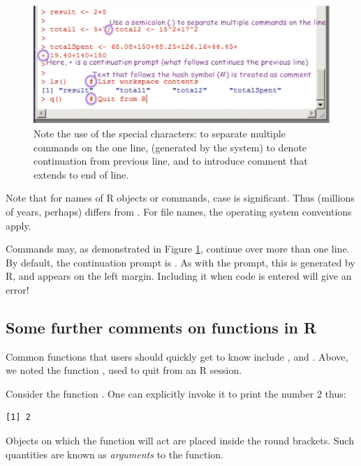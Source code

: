\begin{figure}
\includegraphics{figs-inc/01i-cmds1.jpg}
\caption{Note the use of the special characters: \code{;} to separate
  multiple commands on the one line, \code{+} (generated by the
  system) to denote continuation from previous line, and \code{\#} to
  introduce comment that extends to end of line.\label{fig:cmds1}}
\end{figure}

Note that for names of R objects or commands, case is significant.
Thus  (millions of years, perhaps) differs from .
For file names, the operating system
conventions apply.

Commands may, as demonstrated in Figure \ref{fig:cmds1}, continue over
more than one line. By default, the continuation prompt is \code{+}.
As with the \code{>} prompt, this is generated by R, and appears on
the left margin.  Including it when code is entered will give an
error!  

\subsection{Some further comments on functions in R}

 Common functions that users
  should quickly get to know include , 
  and .  Above, we noted the function , used
  to quit from an R session.

Consider the function . One can explicitly invoke it to print the
number 2 thus:
\begin{knitrout}
\color{fgcolor}\begin{kframe}
\begin{alltt}
\hlstd{(}\hlstd{)}
\end{alltt}
\begin{verbatim}
[1] 2
\end{verbatim}
\end{kframe}
\end{knitrout}
Objects on which the function will act are placed inside the round
brackets.  Such quantities are known as {\em arguments} to the function.

